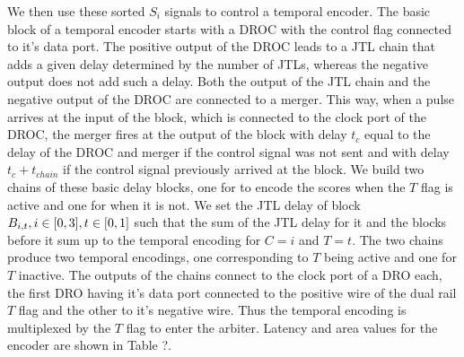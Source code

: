 \documentclass[conference]{IEEEtran}
\begin{document}
We then use these sorted $S_i$ signals to control a temporal encoder.
The basic block of a temporal encoder starts with a DROC with the control flag connected to it's data port.
The positive output of the DROC leads to a JTL chain that adds a given delay determined by the number of JTLs, whereas the negative output does not add such a delay.
Both the output of the JTL chain and the negative output of the DROC are connected to a merger.
This way, when a pulse arrives at the input of the block, which is connected to the clock port of the DROC, the merger fires at the output of the block with delay $t_c$ equal to the delay of the DROC and merger if the control signal was not sent and with delay $t_c + t_{chain}$ if the control signal previously arrived at the block.
We build two chains of these basic delay blocks, one for to encode the scores when the $T$ flag is active and one for when it is not.
We set the JTL delay of block $B_{i,t}, i \in \interval{0}{3}, t \in \interval{0}{1}$ such that the sum of the JTL delay for it and the blocks before it sum up to the temporal encoding for $C = i$ and $T = t$.
The two chains produce two temporal encodings, one corresponding to $T$ being active and one for $T$ inactive.
The outputs of the chains connect to the clock port of a DRO each, the first DRO having it's data port connected to the positive wire of the dual rail $T$ flag and the other to it's negative wire.
Thus the temporal encoding is multiplexed by the $T$ flag to enter the arbiter.
Latency and area values for the encoder are shown in Table ?.
\end{document}
